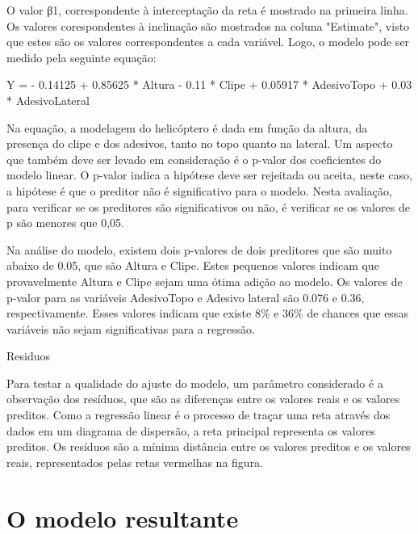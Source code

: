 
O valor β1, correspondente à interceptação da reta é mostrado na primeira linha. Os valores corespondentes à inclinação são mostrados na coluna "Estimate", visto que estes são os valores correspondentes a cada variável. Logo, o modelo pode ser medido pela seguinte equação:

Y = - 0.14125 + 0.85625 * Altura - 0.11 * Clipe + 0.05917 * AdesivoTopo + 0.03 * AdesivoLateral

Na equação, a modelagem do helicóptero é dada em função da altura, da presença do clipe e dos adesivos, tanto no topo quanto na lateral. Um aspecto que também deve ser levado em consideração é o p-valor dos coeficientes do modelo linear. O p-valor indica a hipótese deve ser rejeitada ou aceita, neste caso, a hipótese é que o preditor não é significativo para o modelo. Nesta avaliação, para verificar se os preditores são significativos ou não, é verificar se os valores de p são menores que 0,05.

Na análise do modelo, existem dois p-valores de dois preditores que são muito abaixo de 0.05, que são Altura e Clipe. Estes pequenos valores indicam que provavelmente Altura e Clipe sejam uma ótima adição ao modelo. Os valores de p-valor para as variáveis AdesivoTopo e Adesivo lateral são 0.076 e 0.36, respectivamente. Esses valores indicam que existe 8\% e 36\% de chances que essas variáveis não sejam significativas para a regressão.

Residuos

Para testar a qualidade do ajuste do modelo, um parâmetro considerado é a observação dos resíduos, que são as diferenças entre os valores reais e os valores preditos. Como a regressão linear é o processo de traçar uma reta através dos dados em um diagrama de dispersão, a reta principal representa os valores preditos. Os resíduos são a mínima distância entre os valores preditos e os valores reais, representados pelas retas vermelhas na figura. 










\section{O modelo resultante}
\label{sec:a_modelagem_matematica_o_modelo_resultante}

